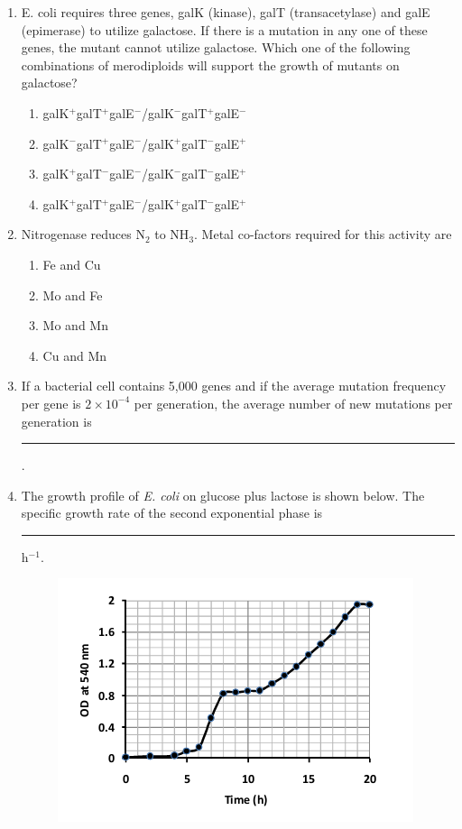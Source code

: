 \documentclass[journal,12pt,onecolumn]{IEEEtran}
\begin{document}
\begin{enumerate}[label=\arabic*.,resume]
\item E. coli requires three genes, galK (kinase), galT (transacetylase) and galE (epimerase) to utilize galactose. If there is a mutation in any one of these genes, the mutant cannot utilize galactose. Which one of the following combinations of merodiploids will support the growth of mutants on galactose?

\begin{enumerate}[label=(\Alph*)]
\item galK$^+$galT$^+$galE$^-$/galK$^-$galT$^+$galE$^-$ 
\item galK$^-$galT$^+$galE$^-$/galK$^+$galT$^-$galE$^+$ 
\item galK$^+$galT$^-$galE$^-$/galK$^-$galT$^-$galE$^+$
\item galK$^+$galT$^+$galE$^-$/galK$^+$galT$^-$galE$^+$
\end{enumerate}

\item Nitrogenase reduces N$_2$ to NH$_3$. Metal co-factors required for this activity are

\begin{multicols}{4}
\begin{enumerate}[label=(\Alph*)]
\item Fe and Cu
\item Mo and Fe
\item Mo and Mn
\item Cu and Mn
\end{enumerate}
\end{multicols}

\item If a bacterial cell contains 5,000 genes and if the average mutation frequency per gene is $2 \times 10^{-4}$ per generation, the average number of new mutations per generation is \rule{2.5cm}{0.1pt}.

\item The growth profile of \textit{E. coli} on glucose plus lactose is shown below. The specific growth rate of the second exponential phase is \rule{2.5cm}{0.1pt} h$^{-1}$.

\begin{figure}[H]
\centering
\includegraphics[width=0.7\columnwidth]{FIG/K-18.png}
\caption*{}
\label{fig:K-18}
\end{figure}


\end{enumerate}
\end{document}
